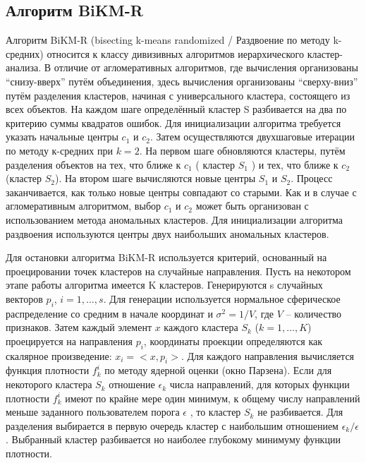 \documentclass[12pt,tikz]{instruction}
\begin{document}
\subsection{Алгоритм BiKM-R} 
Алгоритм BiKM-R (bisecting k-means randomized / Раздвоение по методу k-средних) относится к классу дивизивных алгоритмов иерархического кластер-анализа. В отличие от агломеративных алгоритмов, где вычисления организованы ``снизу-вверх'' путём объединения, здесь вычисления организованы ``сверху-вниз'' путём разделения кластеров, начиная с универсального кластера, состоящего из всех объектов. На каждом шаге определённый кластер S разбивается на два по критерию  суммы квадратов ошибок. Для инициализации алгоритма требуется указать начальные центры $c_1$ и $c_2$. Затем осуществляются двухшаговые итерации по методу к-средних при $ k=2 $. На первом шаге обновляются кластеры, путём разделения объектов на тех, что ближе к $c_1$ ( кластер $ S_1 $ ) и тех, что ближе к $c_2$ (кластер $ S_2$). На втором шаге вычисляются новые центры $ S_1 $ и $ S_2 $. Процесс заканчивается, как только новые центры совпадают со старыми. Как и в случае с агломеративным алгоритмом, выбор $c_1$ и $c_2$ может быть организован с использованием метода аномальных кластеров. Для инициализации алгоритма раздвоения используются центры двух наибольших аномальных кластеров.

Для остановки алгоритма BiKM-R используется критерий, основанный на проецировании точек 
кластеров на случайные направления. Пусть на некотором этапе работы алгоритма имеется K кластеров. Генерируются s случайных векторов $p_i$, $i=1,\ldots,s$. Для генерации используется нормальное 
сферическое распределение со средним в начале координат и $\sigma^2=1/V$, где $V$ – количество признаков. 
Затем каждый элемент $x$ каждого кластера $S_k$ ($k=1,\ldots, K$) проецируется на направления $p_i$, 
координаты проекции определяются как скалярное произведение: $x_i=<x,p_i>$. Для каждого направления 
вычисляется функция плотности $f_k^i$ по методу ядерной оценки (окно Парзена). Если для некоторого кластера $S_k$ отношение $\epsilon_k$ числа направлений, для которых функции плотности  $f_k^i$ имеют по крайне мере один минимум, к общему числу направлений меньше заданного пользователем порога $\epsilon$ , то кластер $S_k$ не разбивается. Для разделения выбирается в первую очередь кластер с наибольшим отношением $\epsilon_k / \epsilon$. Выбранный кластер разбивается но наиболее глубокому минимуму функции плотности.  
\end{document}
